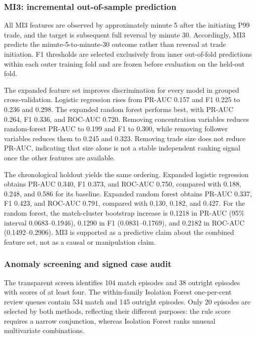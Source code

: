 \subsubsection{MI3: incremental out-of-sample prediction}

All MI3 features are observed by approximately minute 5 after the initiating
P99 trade, and the target is subsequent full reversal by minute 30. Accordingly,
MI3 predicts the minute-5-to-minute-30 outcome rather than reversal at trade
initiation. F1 thresholds are selected exclusively from inner out-of-fold
predictions within each outer training fold and are frozen before evaluation on
the held-out fold.

The expanded feature set improves discrimination for every model in grouped
cross-validation. Logistic regression rises from PR-AUC 0.157 and F1 0.225 to
0.236 and 0.298. The expanded random forest performs best, with PR-AUC 0.264,
F1 0.336, and ROC-AUC 0.720. Removing concentration variables reduces
random-forest PR-AUC to 0.199 and F1 to 0.300, while removing follower variables reduces
them to 0.245 and 0.323. Removing trade size does not reduce PR-AUC, indicating
that size alone is not a stable independent ranking signal once the other
features are available.

The chronological holdout yields the same ordering. Expanded logistic
regression obtains PR-AUC 0.340, F1 0.373, and ROC-AUC 0.750, compared with
0.188, 0.248, and 0.586 for its baseline. Expanded random forest obtains PR-AUC
0.337, F1 0.423, and ROC-AUC 0.791, compared with 0.130, 0.182, and 0.427. For
the random forest, the match-cluster bootstrap increase is 0.1218 in PR-AUC
(95\% interval 0.0683--0.1946), 0.1290 in F1 (0.0831--0.1769), and 0.2182 in
ROC-AUC (0.1492--0.2906). MI3 is supported as a predictive claim about the
combined feature set, not as a causal or manipulation claim.

\subsubsection{Anomaly screening and signed case audit}

The transparent screen identifies 104 match episodes and 38 outright episodes
with scores of at least four. The within-family Isolation Forest one-per-cent
review queues contain 534 match and 145 outright episodes. Only 20 episodes are
selected by both methods, reflecting their different purposes: the rule score
requires a narrow conjunction, whereas Isolation Forest ranks unusual
multivariate combinations.

